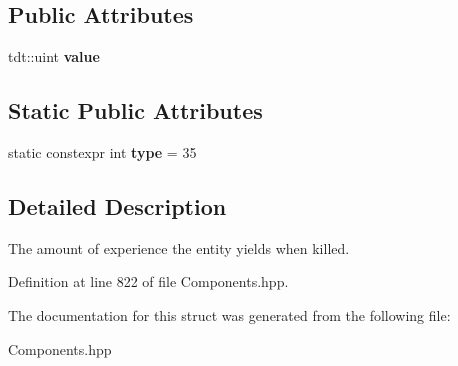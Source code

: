 \subsection*{Public Attributes}
\begin{DoxyCompactItemize}
\item 
tdt\+::uint {\bfseries value}\hypertarget{struct_experience_value_component_af23c393293e39fabc99cfee417bb038c}{}\label{struct_experience_value_component_af23c393293e39fabc99cfee417bb038c}

\end{DoxyCompactItemize}
\subsection*{Static Public Attributes}
\begin{DoxyCompactItemize}
\item 
static constexpr int {\bfseries type} = 35\hypertarget{struct_experience_value_component_aec9243dc7a28d3e133900d2367a00818}{}\label{struct_experience_value_component_aec9243dc7a28d3e133900d2367a00818}

\end{DoxyCompactItemize}


\subsection{Detailed Description}
The amount of experience the entity yields when killed. 

Definition at line 822 of file Components.\+hpp.



The documentation for this struct was generated from the following file\+:\begin{DoxyCompactItemize}
\item 
Components.\+hpp\end{DoxyCompactItemize}
